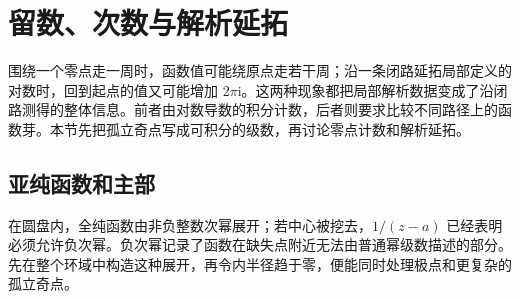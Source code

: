 
% 
% 

\section{留数、次数与解析延拓}
\label{g4:sec:0102}

围绕一个零点走一周时，函数值可能绕原点走若干周；沿一条闭路延拓局部定义的对数时，回到起点的值又可能增加 \(2\pi\mathrm{i}\)。这两种现象都把局部解析数据变成了沿闭路测得的整体信息。前者由对数导数的积分计数，后者则要求比较不同路径上的函数芽。本节先把孤立奇点写成可积分的级数，再讨论零点计数和解析延拓。

\subsection{亚纯函数和主部}
\label{g4:subsec:0102:01}
在圆盘内，全纯函数由非负整数次幂展开；若中心被挖去，\(1/(z-a)\) 已经表明必须允许负次幂。负次幂记录了函数在缺失点附近无法由普通幂级数描述的部分。先在整个环域中构造这种展开，再令内半径趋于零，便能同时处理极点和更复杂的孤立奇点。

